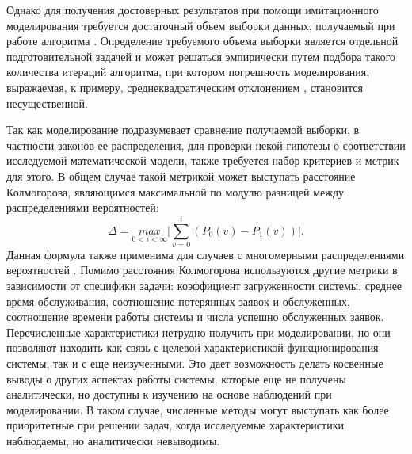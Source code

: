 Однако для получения достоверных результатов при помощи имитационного моделирования требуется достаточный объем выборки данных, получаемый при работе алгоритма \cite{лобач2004имитационное,моисеев2016исследование}. Определение требуемого объема выборки является отдельной подготовительной задачей и может решаться эмпирически путем подбора такого количества итераций алгоритма, при котором погрешность моделирования, выражаемая, к примеру, среднеквадратическим отклонением \cite{алиев2013погрешности}, становится несущественной.

Так как моделирование подразумевает сравнение получаемой выборки, в частности законов ее распределения, для проверки некой гипотезы о соответствии исследуемой математической модели, также требуется набор критериев и метрик для этого. В общем случае такой метрикой может выступать расстояние Колмогорова, являющимся максимальной по модулю разницей между распределениями вероятностей:
\begin{equation}\label{kdistance}
	\Delta = \underset{0 < i < \infty}{max}\bigg\rvert \sum_{v=0}^{i} (P_0(v) - P_1(v))\bigg\rvert.
\end{equation}
Данная формула также применима для случаев с многомерными распределениями вероятностей \cite{fasano1987multidimensional}. Помимо расстояния Колмогорова используются другие метрики в зависимости от специфики задачи: коэффициент загруженности системы, среднее время обслуживания, соотношение потерянных заявок и обслуженных, соотношение времени работы системы и числа успешно обслуженных заявок. Перечисленные характеристики нетрудно получить при моделировании, но они позволяют находить как связь с целевой характеристикой функционирования системы, так и с еще неизученными. Это дает возможность делать косвенные выводы о других аспектах работы системы, которые еще не получены аналитически, но доступны к изучению на основе наблюдений при моделировании. В таком случае, численные методы могут выступать как более приоритетные при решении задач, когда исследуемые характеристики наблюдаемы, но аналитически невыводимы.
